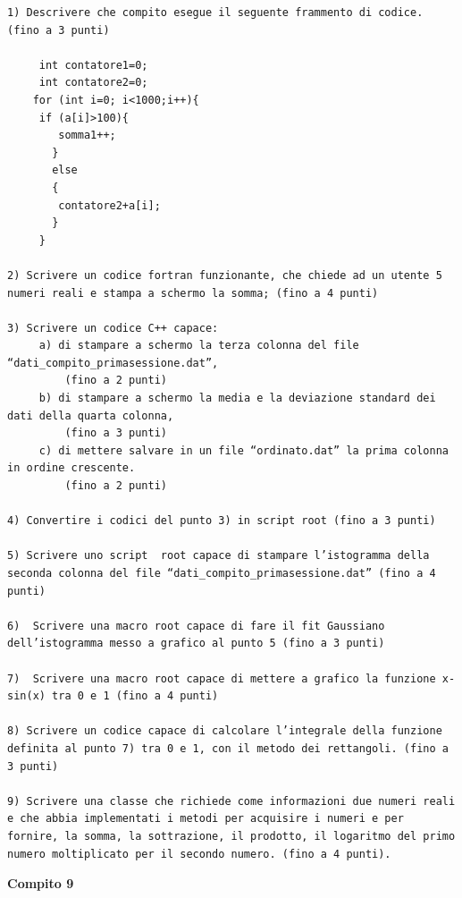 \documentclass[11pt,fleqn]{book} %
\begin{document}
\begin{verbatim}
1) Descrivere che compito esegue il seguente frammento di codice. (fino a 3 punti)

     int contatore1=0;
     int contatore2=0;
    for (int i=0; i<1000;i++){
     if (a[i]>100){
        somma1++;
       }
       else
       {
        contatore2+a[i];
       }
     }
       
2) Scrivere un codice fortran funzionante, che chiede ad un utente 5 numeri reali e stampa a schermo la somma; (fino a 4 punti)

3) Scrivere un codice C++ capace:
     a) di stampare a schermo la terza colonna del file “dati_compito_primasessione.dat”, 
         (fino a 2 punti)
     b) di stampare a schermo la media e la deviazione standard dei dati della quarta colonna,
         (fino a 3 punti)
     c) di mettere salvare in un file “ordinato.dat” la prima colonna in ordine crescente.
         (fino a 2 punti)

4) Convertire i codici del punto 3) in script root (fino a 3 punti)

5) Scrivere uno script  root capace di stampare l’istogramma della seconda colonna del file “dati_compito_primasessione.dat” (fino a 4 punti)

6)  Scrivere una macro root capace di fare il fit Gaussiano dell’istogramma messo a grafico al punto 5 (fino a 3 punti)

7)  Scrivere una macro root capace di mettere a grafico la funzione x-sin(x) tra 0 e 1 (fino a 4 punti)

8) Scrivere un codice capace di calcolare l’integrale della funzione definita al punto 7) tra 0 e 1, con il metodo dei rettangoli. (fino a 3 punti)

9) Scrivere una classe che richiede come informazioni due numeri reali e che abbia implementati i metodi per acquisire i numeri e per fornire, la somma, la sottrazione, il prodotto, il logaritmo del primo numero moltiplicato per il secondo numero. (fino a 4 punti).
\end{verbatim}

\textbf{Compito 9}
\end{document}
